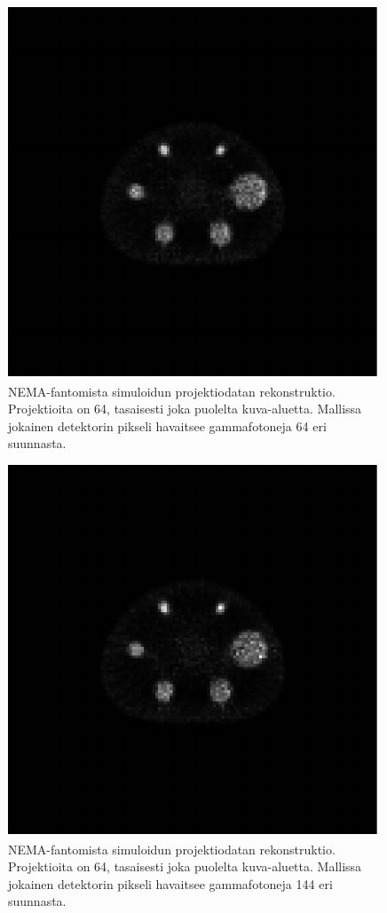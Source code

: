 \begin{figure}[H]
    \centering
    \captionsetup{width=.9\linewidth}
    \includegraphics[width=.9\linewidth]{kuvat/rekonstruktio_nRay64.pdf}
    \caption{NEMA-fantomista simuloidun projektiodatan rekonstruktio. Projektioita on 64, tasaisesti joka puolelta kuva-aluetta. Mallissa jokainen detektorin pikseli havaitsee gammafotoneja 64 eri suunnasta.}
    \label{fig:rekonstruktio64}
\end{figure}
\begin{figure}[H]
    \centering
    \captionsetup{width=.9\linewidth}
    \includegraphics[width=.9\linewidth]{kuvat/rekonstruktio_nRay144.pdf}
    \caption{NEMA-fantomista simuloidun projektiodatan rekonstruktio. Projektioita on 64, tasaisesti joka puolelta kuva-aluetta. Mallissa jokainen detektorin pikseli havaitsee gammafotoneja 144 eri suunnasta.}
    \label{fig:rekonstruktio144}
\end{figure}
\fi
